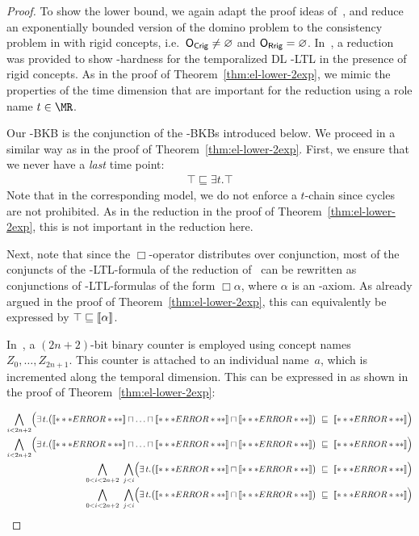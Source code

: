 \begin{proof}
  To show the lower bound, we again adapt the proof ideas of~\cite{BaGL-KR08,BaGL-ToCL12}, and
  reduce an exponentially bounded version of the domino problem to the consistency problem in \ELALC
  with rigid concepts, i.e.~$\mathsf{O_{Crig}}\ne\varnothing$ and $\mathsf{O_{Rrig}}=\varnothing$.
  In~\cite{BaGL-KR08,BaGL-ToCL12}, a reduction was provided to show \NExpTime-hardness for the
  temporalized DL \ALC-LTL in the presence of rigid concepts.
  As in the proof of Theorem~\ref{thm:el-lower-2exp}, we mimic the properties of the time dimension
  that are important for the reduction using a role name $t\in\MR$.
    
  Our \ELALC-BKB is the conjunction of the \ELALC-BKBs introduced below.  We proceed in a similar
  way as in the proof of Theorem~\ref{thm:el-lower-2exp}.
  First, we ensure that we never have a \emph{last} time point:
  \begin{gather*}
    \top\sqsubseteq\exists t.\top
  \end{gather*}
  Note that in the corresponding model, we do not enforce a $t$-chain since cycles are not
  prohibited.  As in the reduction in the proof of Theorem~\ref{thm:el-lower-2exp}, this is not
  important in the reduction here.

  Next, note that since the $\Box$-operator distributes over conjunction, most of the conjuncts of
  the \ALC-LTL-formula of the reduction of~\cite{BaGL-KR08,BaGL-ToCL12} can be rewritten as
  conjunctions of \ALC-LTL-formulas of the form $\Box\alpha$, where $\alpha$ is an \ALC-axiom.  As
  already argued in the proof of Theorem~\ref{thm:el-lower-2exp}, this can equivalently be expressed
  by $\top\sqsubseteq\llbracket\alpha\rrbracket$.

  In~\cite{BaGL-KR08,BaGL-ToCL12}, a $(2n+2)$-bit binary counter is employed using concept names
  $Z_0,\dots,Z_{2n+1}$.  This counter is attached to an individual name~$a$, which is incremented
  along the temporal dimension.  This can be expressed in \ELALC as shown in the proof of
  Theorem~\ref{thm:el-lower-2exp}:

  \begin{align*}
    \bigwedge_{i<2n+2} \Bigl( \exists t.\bigl(\oax{Z_{0}(a)} \sqcap\ldots\sqcap \oax{Z_{i-1}(a)} \sqcap \oax{Z_{i}(a)}\bigr)
    & \ \sqsubseteq\ \oax{(\lnot Z_{i})(a)}\Bigr)\\ 
    \bigwedge_{i<2n+2}\Bigl( \exists t.\bigl(\oax{Z_{0}(a)}\sqcap\ldots\sqcap \oax{Z_{i-1}(a)} \sqcap \oax{(\lnot Z_{i})(a)}\bigr)
    & \ \sqsubseteq\ \oax{Z_{i}(a)}\Bigr)\\
    \bigwedge_{0<i<2n+2}\ \bigwedge_{j<i}\Bigl(\exists t.\bigl(\oax{(\lnot Z_{j})(a)}\sqcap\oax{Z_{i}(a)}\bigr)
    & \ \sqsubseteq\ \oax{Z_{i}(a)}\Bigr)\\
    \bigwedge_{0<i<2n+2}\ \bigwedge_{j<i}\Bigl(\exists t.\bigl(\oax{(\lnot Z_{j})(a)}\sqcap\oax{(\lnot Z_{i})(a)}\bigr)
    & \ \sqsubseteq\ \oax{(\lnot Z_{i})(a)}\Bigr)
  \end{align*}


\end{proof}
